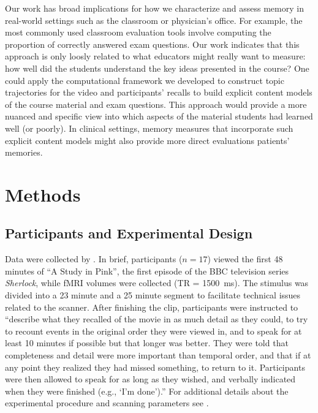 \documentclass{article}
\begin{document}
Our work has broad implications for how we characterize and assess memory in real-world settings such as the classroom or physician's office.  For example, the most commonly used classroom evaluation tools involve computing the proportion of correctly answered exam questions.  Our work indicates that this approach is only loosly related to what educators might really want to measure: how well did the students understand the key ideas presented in the course?  One could apply the computational framework we developed to construct topic trajectories for the video and participants' recalls to build explicit content models of the course material and exam questions.  This approach would provide a more nuanced and specific view into which aspects of the material students had learned well (or poorly).  In clinical settings, memory measures that incorporate such explicit content models might also provide more direct evaluations patients' memories.




\section*{Methods}
\label{sec:methods}

\subsection*{Participants and Experimental Design}
Data were collected by \cite{ChenEtal17}.  In brief, participants ($n=17$) viewed the first 48 minutes of ``A Study in Pink'', the first episode of the BBC television series \textit{Sherlock}, while fMRI volumes were collected (TR = 1500~ms).  The stimulus was divided into a 23 minute and a 25 minute segment to facilitate technical issues related to the scanner.  After finishing the clip, participants were instructed to \citep[quoting from][]{ChenEtal17} ``describe what they recalled of the movie in as much detail as they could, to try to recount events in the original order they were viewed in, and to speak for at least 10 minutes if possible but that longer was better. They were told that completeness and detail were more important than temporal order, and that if at any point they realized they had missed something, to return to it. Participants were then allowed to speak for as long as they wished, and verbally indicated when they were finished (e.g., `I’m done').''  For additional details about the experimental procedure and scanning parameters see \cite{ChenEtal17}.
\end{document}
